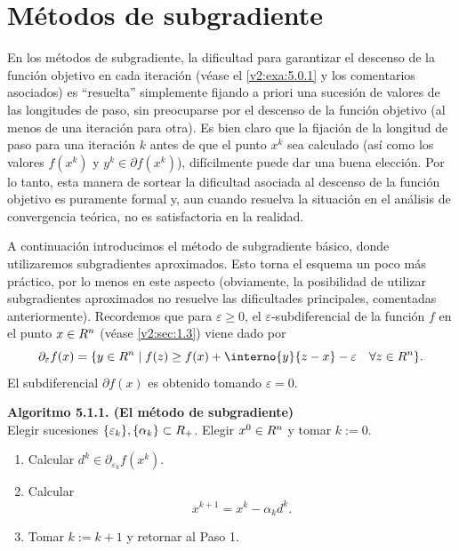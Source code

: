 
\section{Métodos de subgradiente}
\label{v2:sec:5.1}

En los métodos de subgradiente, la dificultad para garantizar el descenso de la función objetivo en cada iteración (véase el \cref{v2:exa:5.0.1} y los comentarios asociados) es ``resuelta'' simplemente fijando a priori una sucesión de valores de las longitudes de paso, sin preocuparse por el descenso de la función objetivo (al menos de una iteración para otra). Es bien claro que la fijación de la longitud de paso para una iteración $k$ antes de que el punto $x^k$ sea calculado (así como los valores $f(x^k)$ y $y^k \in \partial f(x^k)$), difícilmente puede dar una buena elección. Por lo tanto, esta manera de sortear la dificultad asociada al descenso de la función objetivo es puramente formal y, aun cuando resuelva la situación en el análisis de convergencia teórica, no es satisfactoria en la realidad.

A continuación introducimos el método de subgradiente básico, donde utilizaremos subgradientes aproximados. Esto torna el esquema un poco más práctico, por lo menos en este aspecto (obviamente, la posibilidad de utilizar subgradientes aproximados no resuelve las dificultades principales, comentadas anteriormente). Recordemos que para $\varepsilon \ge 0$, el $\varepsilon$-subdiferencial de la función $f$ en el punto $x \in R^n$ (véase \cref{v2:sec:1.3}) viene dado por
\begin{equation}
    \partial_\varepsilon f(x) = \{ y \in \Rn \mid f(z) \ge f(x) + \interno{y}{z - x} - \varepsilon \quad \forall z \in \Rn \}.
    \label{v2:eq:5.3}
\end{equation}
El subdiferencial $\partial f(x)$ es obtenido tomando $\varepsilon = 0$.

\vspace{0.3cm}
\noindent \textbf{Algoritmo 5.1.1. (El método de subgradiente)} \\
Elegir sucesiones $\{\varepsilon_k\}, \{\alpha_k\} \subset R_+$. Elegir $x^0 \in R^n$ y tomar $k := 0$.
\begin{enumerate}[label=\arabic*., itemsep=0.1cm, topsep=0.1cm]
    \item Calcular $d^k \in \partial_{\varepsilon_k} f(x^k)$.
    \item Calcular
    \begin{equation}
        x^{k+1} = x^k - \alpha_k d^k.
        \label{v2:eq:5.4}
    \end{equation}
    \item Tomar $k := k + 1$ y retornar al Paso 1.
\end{enumerate}
\vspace{0.3cm}

